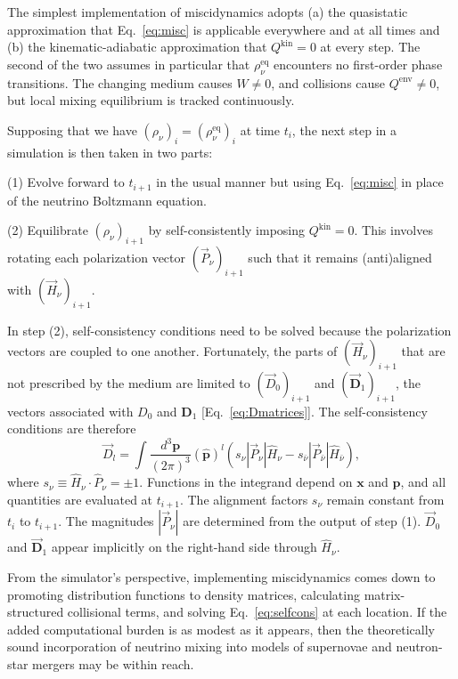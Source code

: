 \documentclass[aps,prl,twocolumn,groupedaddress]{revtex4-2}
\begin{document}
The simplest implementation of miscidynamics adopts (a) the quasistatic approximation that Eq.~\eqref{eq:misc} is applicable everywhere and at all times and (b) the kinematic-adiabatic approximation that $Q^\textrm{kin} = 0$ at every step. The second of the two assumes in particular that $\rho_\nu^\textrm{eq}$ encounters no first-order phase transitions. The changing medium causes $W \neq 0$, and collisions cause $Q^\textrm{env} \neq 0$, but local mixing equilibrium is tracked continuously.

Supposing that we have $( \rho_\nu )_i = ( \rho_\nu^\textrm{eq} )_i$ at time $t_i$, the next step in a simulation is then taken in two parts:

(1) Evolve forward to $t_{i+1}$ in the usual manner but using Eq.~\eqref{eq:misc} in place of the neutrino Boltzmann equation.

(2) Equilibrate $( \rho_\nu )_{i+1}$ by self-consistently imposing $Q^\textrm{kin} = 0$. This involves rotating each polarization vector $( \vec{P}_\nu )_{i+1}$ such that it remains (anti)aligned with $( \vec{H}_\nu )_{i+1}$.

In step (2), self-consistency conditions need to be solved because the polarization vectors are coupled to one another. Fortunately, the parts of $( \vec{H}_\nu )_{i+1}$ that are not prescribed by the medium are limited to $( \vec{D}_0 )_{i+1}$ and $( \vec{\boldsymbol{D}}_1 )_{i+1}$, the vectors associated with $D_0$ and $\boldsymbol{D}_1$ [Eq.~\eqref{eq:Dmatrices}]. The self-consistency conditions are therefore
\begin{equation}
\vec{D}_l = \int \frac{d^3 \boldsymbol{p}}{(2\pi)^3} \left( \boldsymbol{\hat{p}} \right)^l \left( s_\nu | \vec{P}_\nu | \hat{H}_\nu - s_{\bar{\nu}} | \vec{P}_{\bar{\nu}} | \hat{H}_{\bar{\nu}} \right), \label{eq:selfcons}
\end{equation}
where $s_\nu \equiv \hat{H}_\nu \cdot \hat{P}_\nu = \pm 1$. Functions in the integrand depend on $\boldsymbol{x}$ and $\boldsymbol{p}$, and all quantities are evaluated at $t_{i+1}$. The alignment factors $s_\nu$ remain constant from $t_i$ to $t_{i+1}$. The magnitudes $| \vec{P}_\nu |$ are determined from the output of step (1). $\vec{D}_0$ and $\vec{\boldsymbol{D}}_1$ appear implicitly on the right-hand side through $\hat{H}_\nu$.

From the simulator's perspective, implementing miscidynamics comes down to promoting distribution functions to density matrices, calculating matrix-structured collisional terms, and solving Eq.~\eqref{eq:selfcons} at each location. If the added computational burden is as modest as it appears, then the theoretically sound incorporation of neutrino mixing into models of supernovae and neutron-star mergers may be within reach.
\end{document}
